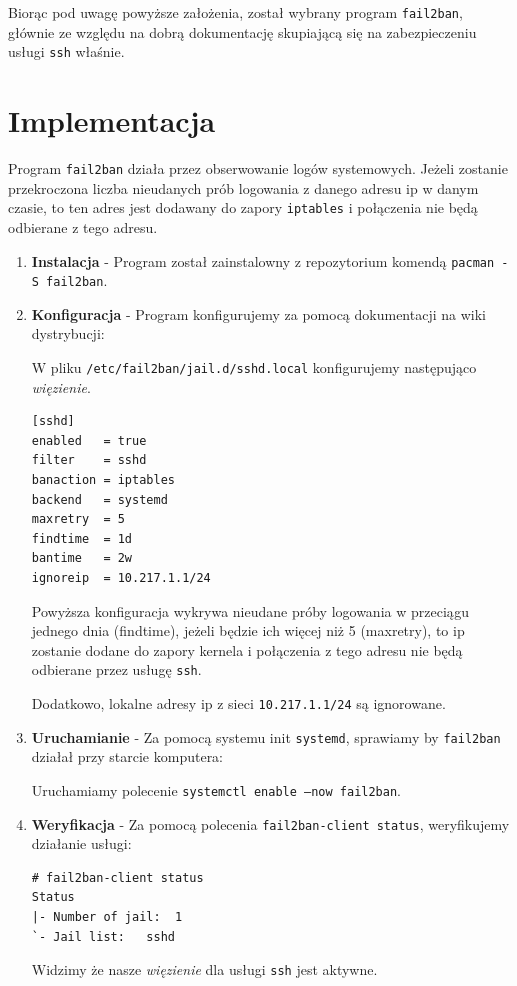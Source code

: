\documentclass[12pt,a4paper]{article}
\begin{document}
Biorąc pod uwagę powyższe założenia, został wybrany program \texttt{fail2ban},
głównie ze względu na dobrą dokumentację skupiającą się na zabezpieczeniu usługi
\texttt{ssh} właśnie.

\newpage

\section{Implementacja}

Program \texttt{fail2ban} działa przez obserwowanie logów systemowych. Jeżeli
zostanie przekroczona liczba nieudanych prób logowania z danego adresu ip w
danym czasie, to ten adres jest dodawany do zapory \texttt{iptables} i
połączenia nie będą odbierane z tego adresu.


\begin{enumerate}
  \item \textbf{Instalacja} - Program został zainstalowny z repozytorium komendą
    \texttt{pacman -S fail2ban}.
  \item \textbf{Konfiguracja} - Program konfigurujemy za pomocą dokumentacji na
    wiki dystrybucji:

    W pliku \texttt{/etc/fail2ban/jail.d/sshd.local} konfigurujemy
    następująco \emph{więzienie}.
    \begin{lstlisting}
[sshd]
enabled   = true
filter    = sshd
banaction = iptables
backend   = systemd
maxretry  = 5
findtime  = 1d
bantime   = 2w
ignoreip  = 10.217.1.1/24      
    \end{lstlisting}

    Powyższa konfiguracja wykrywa nieudane próby logowania w przeciągu
    jednego dnia (findtime), jeżeli będzie ich więcej niż 5 (maxretry), to 
    ip zostanie dodane do zapory kernela i połączenia z tego adresu nie będą
    odbierane przez usługę \texttt{ssh}.

    Dodatkowo, lokalne adresy ip z sieci \texttt{10.217.1.1/24} są
    ignorowane.

  \item \textbf{Uruchamianie} - Za pomocą systemu init \texttt{systemd},
    sprawiamy by \texttt{fail2ban} działał przy starcie komputera:

    Uruchamiamy polecenie \texttt{systemctl enable --now fail2ban}.

  \item \textbf{Weryfikacja} - Za pomocą polecenia \texttt{fail2ban-client
    status}, weryfikujemy działanie usługi:
    \begin{lstlisting}
# fail2ban-client status
Status
|- Number of jail:	1
`- Jail list:	sshd
    \end{lstlisting}

    Widzimy że nasze \emph{więzienie} dla usługi \texttt{ssh} jest aktywne.
\end{enumerate}
\end{document}
